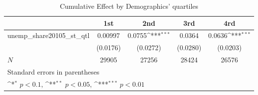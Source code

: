 \begin{table}[htbp]\centering
\def\sym#1{\ifmmode^{#1}\else\(^{#1}\)\fi}
\caption{Cumulative Effect by Demographics' quartiles}
\begin{tabular}{l*{4}{c}}
\hline\hline
            &\multicolumn{1}{c}{1st}&\multicolumn{1}{c}{2nd}&\multicolumn{1}{c}{3rd}&\multicolumn{1}{c}{4rd}\\
\hline
unemp\_share20105\_st\_qtl&     0.00997         &      0.0755\sym{***}&      0.0364         &      0.0636\sym{***}\\
            &    (0.0176)         &    (0.0272)         &    (0.0280)         &    (0.0203)         \\
\hline
\(N\)       &       29905         &       27256         &       28424         &       26576         \\
\hline\hline
\multicolumn{5}{l}{\footnotesize Standard errors in parentheses}\\
\multicolumn{5}{l}{\footnotesize \sym{*} \(p<0.1\), \sym{**} \(p<0.05\), \sym{***} \(p<0.01\)}\\
\end{tabular}
\end{table}
